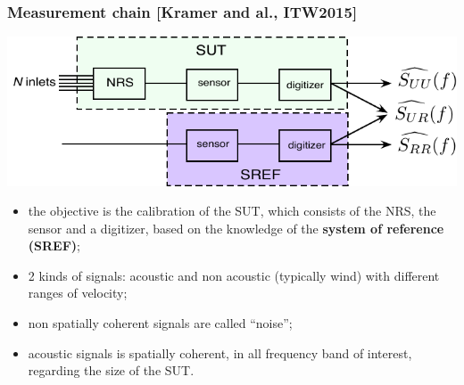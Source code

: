 \documentclass[handout,10pt]{beamer}
\begin{document}
\begin{frame}
\frametitle{Measurement chain [Kramer and al., ITW2015]}


\begin{center}
\includegraphics[scale=0.65]{fulltestbedIS26.pdf}
\end{center}



\begin{itemize}
\item
the objective is the calibration of the SUT, which consists of the NRS, the sensor and a digitizer, based on the knowledge of the {\bf system of reference (SREF)};
\item
2 kinds of signals: acoustic and non acoustic (typically wind) with different ranges of velocity;
\item
non spatially coherent signals are called ``noise'';
\item
acoustic signals is spatially coherent, in all frequency band of interest, regarding the size of the SUT. 
\end{itemize}


\end{frame}
\end{document}
